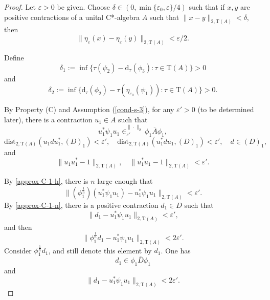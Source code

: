 \documentclass[12pt, oneside, psamsfonts]{amsart}
\theoremstyle{definition}
\theoremstyle{remark}
\numberwithin{equation}{section}
\newcommand{\norm}[1]{\| #1\|}
\newcommand{\eps}{\varepsilon}
\newcommand{\tr}{\mathrm{T}}
\begin{document}
\begin{proof}
Let $\eps>0$ be given. Choose $\delta \in (0, \min\{\eps_0, \eps\}/4)$ such that if $x, y$ are positive contractions of a unital C*-algebra $A$ such that $\norm{x - y}_{2, \tr(A)} < \delta$, then
\begin{equation}\label{pre-pert-delta}
\norm{\eta_\eps(x) - \eta_\eps(y)}_{2, \tr(A)} < \eps/2.
\end{equation}


Define
$$ \delta_1 := \inf\{\tau(\psi_2) - \mathrm{d}_\tau(\phi_3): \tau \in \tr(A)\} >0$$
and
$$\delta_2 := \inf\{\mathrm{d}_\tau(\phi_2) - \tau(\eta_{\eps_0}(\psi_1)): \tau \in \tr(A)\} > 0. $$

By Property (C) and Assumption (\ref{cond-s-3}), for any $\eps'>0$ (to be determined later), there is a contraction $u_1\in A$ such that
\begin{equation}\label{approx-C-1-h}
u^*_1 \psi_1 u_1 \in^{\norm{\cdot}_2}_{\eps'} \overline{\phi_1 A \phi_1}, 
\end{equation}
\begin{equation}\label{approx-C-1-n}
\mathrm{dist}_{2, \tr(A)}(u_1du^*_1, (D)_1) < \eps', \quad \mathrm{dist}_{2, \tr(A)}(u_1^*du_1, (D)_1) < \eps',\quad d \in (D)_1, 
\end{equation}
and
\begin{equation}\label{approx-C-1-u}
\norm{u_1u_1^* - 1}_{2, \tr(A)},\quad  \norm{u_1^*u_1 - 1}_{2, \tr(A)} < \eps'.
\end{equation}

By \eqref{approx-C-1-h}, there is $n$ large enough that $$ \norm{(\phi_1^{\frac{1}{n}}) (u_1^*\psi_1u_1) - u_1^*\psi_1u_1}_{2, \tr(A)} < \eps'. 
$$
By \eqref{approx-C-1-n}, there is a positive contraction $d_1 \in D$ such that
\begin{equation*}
\norm{d_1- u_1^*\psi_1u_1}_{2, \tr(A)}< \eps', 
\end{equation*}
and then
$$\norm{\phi_1^{\frac{1}{n}}d_1 - u_1^*\psi_1u_1}_{2, \tr(A)} < 2\eps'. 
$$
Consider $\phi_1^{\frac{1}{n}}d_1$, and still denote this element by $d_1$. One has $$d_1 \in \overline{\phi_1 D \phi_1}$$
and
\begin{equation}\label{approx-C-1}
\norm{d_1 - u_1^*\psi_1u_1}_{2, \tr(A)} < 2\eps'. 
\end{equation}



\end{proof}
\end{document}
